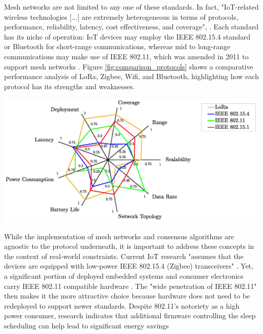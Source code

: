 Mesh networks are not limited to any one of these standards. In fact, "IoT-related wireless technologies [...] are extremely heterogeneous in terms of protocols, performance, reliability, latency, cost effectiveness, and coverage",  \cite{iot_survey_cilfone2019wireless}. Each standard has its niche of operation: IoT devices may employ the IEEE 802.15.4 standard or Bluetooth for short-range communications, whereas mid to long-range communications may make use of IEEE 802.11, which was amended in 2011 to support mesh networks \cite{ti_lethaby2017wireless, iot_survey_cilfone2019wireless}. Figure \ref{fig:comparison_protocols} shows a comparative performance analysis of LoRa, Zigbee, Wifi, and Bluetooth, highlighting how each protocol has its strengths and weaknesses.

\begingroup
    \centering
    \medskip
    \includegraphics[width=0.85\columnwidth]{final-proposal/images/comp_perf_analysis.png}
    \label{fig:comparison_protocols}
\endgroup

While the implementation of mesh networks and consensus algorithms are agnostic to the protocol underneath, it is important to address these concepts in the context of real-world constraints. Current IoT research "assumes that the devices are equipped with low-power IEEE 802.15.4 (Zigbee) transceivers" \cite{disney_glaropoulos2013enhanced}. Yet, a significant portion of deployed embedded systems and consumer electronics carry IEEE 802.11 compatible hardware \cite{disney_glaropoulos2013enhanced}. 
The "wide penetration of IEEE 802.11" \cite{disney_glaropoulos2013enhanced} then makes it the more attractive choice because hardware does not need to be redeployed to support newer standards. Despite 802.11's notoriety as a high power consumer, research indicates that additional firmware controlling the sleep scheduling can help lead to significant energy savings \cite{disney_glaropoulos2013enhanced, barghi2019practicalpower}

